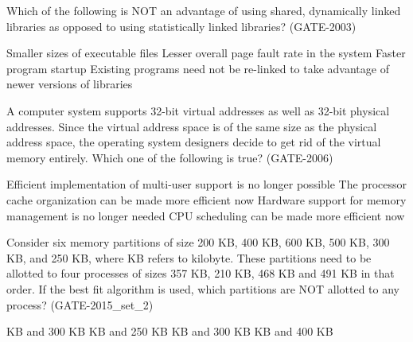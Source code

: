 
\begin{questyle}

  \question  Which of the following is NOT an advantage of using shared, dynamically linked libraries as opposed to
              using statistically linked libraries? (GATE-2003)

  \begin{choices}
    \choice Smaller sizes of executable files
    \choice Lesser overall page fault rate in the system
    \correctchoice Faster program startup
    \choice Existing programs need not be re-linked to take advantage of newer versions of libraries
  \end{choices}

\end{questyle}


\begin{questyle}

  \question  A computer system supports 32-bit virtual addresses as well as 32-bit physical addresses.
             Since the virtual address space is of the same size as the physical address space, the operating system
             designers decide to get rid of the virtual memory entirely. Which one of the following is true? (GATE-2006)

  \begin{choices}
    \choice Efficient implementation of multi-user support is no longer possible
    \choice The processor cache organization can be made more efficient now
    \correctchoice Hardware support for memory management is no longer needed
    \choice CPU scheduling can be made more efficient now
  \end{choices}

\end{questyle}



\begin{questyle}

  \question  Consider six memory partitions of size 200 KB, 400 KB, 600 KB, 500 KB, 300 KB, and 250 KB,
            where KB refers to kilobyte. These partitions need to be allotted to four processes of
            sizes 357 KB, 210 KB, 468 KB and 491 KB in that order. If the best fit algorithm is used,
            which partitions are NOT allotted to any process? (GATE-2015\_set\_2)

  \begin{choices}
     KB and 300 KB
     KB and 250 KB
     KB and 300 KB
     KB and 400 KB
  \end{choices}

\end{questyle}


